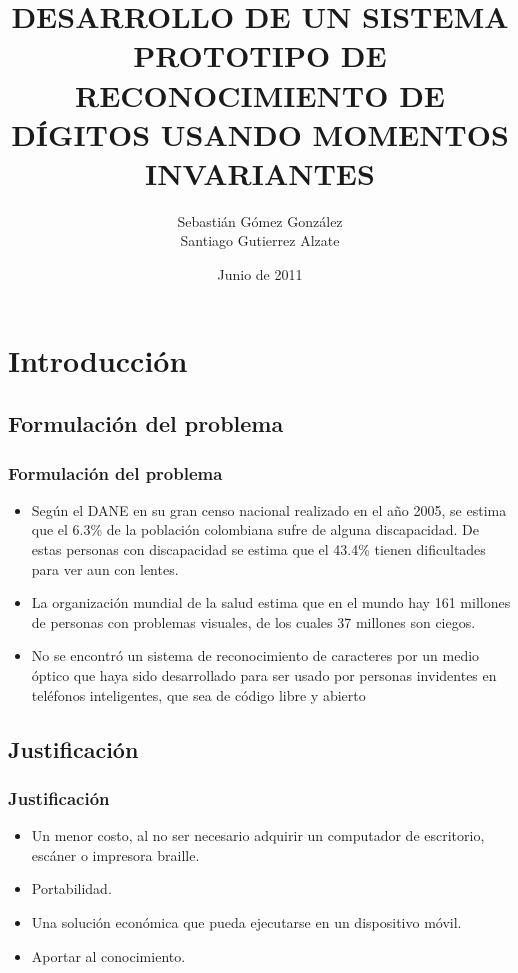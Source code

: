 \documentclass{beamer}
\title {DESARROLLO DE UN SISTEMA PROTOTIPO DE RECONOCIMIENTO DE DÍGITOS USANDO MOMENTOS INVARIANTES}
\author { Sebastián Gómez González \\ Santiago Gutierrez Alzate}
\date {Junio de 2011}
\begin{document}
	\frame{\titlepage}
	
	\frame{\tableofcontents}
	
	\section{Introducción}
	\subsection{Formulación del problema}
	\begin{frame}
		\frametitle{Formulación del problema}
		\begin{itemize}
			\item Según el DANE en su gran censo nacional realizado en el año 2005, se estima que el 6.3\% de la población colombiana sufre de alguna discapacidad. De estas personas con discapacidad se estima que el 43.4\% tienen dificultades para ver aun con lentes.\pause
			\item La organización mundial de la salud estima que en el mundo hay 161 millones de personas con problemas visuales, de los cuales 37 millones son ciegos.\pause
			\item No se encontró un sistema de reconocimiento de caracteres por un medio óptico que haya sido desarrollado para ser usado por personas invidentes en teléfonos inteligentes, que sea de código libre y abierto 
		\end{itemize}
	\end{frame}
	
	\subsection{Justificación}
	\begin{frame}
		\frametitle{Justificación}
		\begin{itemize}
			\item Un menor costo, al no ser necesario adquirir un computador de escritorio, escáner o impresora braille. \pause
			\item Portabilidad.\pause
			\item Una solución económica que pueda ejecutarse en un dispositivo móvil.\pause
			\item Aportar al conocimiento.
		\end{itemize}
	\end{frame}
	
\end{document}
